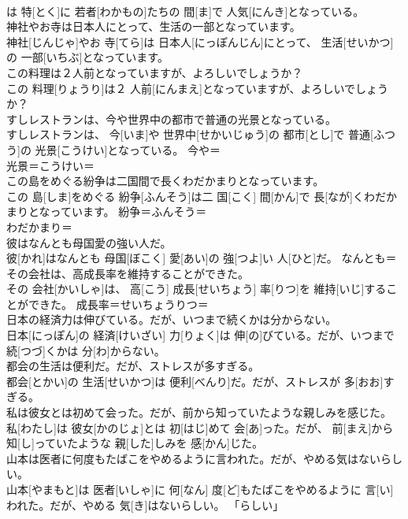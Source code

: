 \documentclass[8pt]{extreport}
\begin{document}
\begin{CJK}{UTF8}{min}
\\	は 特[とく]に 若者[わかもの]たちの 間[ま]で 人気[にんき]となっている。	
\\	神社やお寺は日本人にとって、生活の一部となっています。	
\\	神社[じんじゃ]やお 寺[てら]は 日本人[にっぽんじん]にとって、 生活[せいかつ]の 一部[いちぶ]となっています。	
\\	この料理は２人前となっていますが、よろしいでしょうか？	
\\	この 料理[りょうり]は２ 人前[にんまえ]となっていますが、よろしいでしょうか？	
\\	すしレストランは、今や世界中の都市で普通の光景となっている。	
\\	すしレストランは、 今[いま]や 世界中[せかいじゅう]の 都市[とし]で 普通[ふつう]の 光景[こうけい]となっている。	今や＝ 
\\	光景＝こうけい＝ 
\\	この島をめぐる紛争は二国間で長くわだかまりとなっています。	
\\	この 島[しま]をめぐる 紛争[ふんそう]は二 国[こく] 間[かん]で 長[なが]くわだかまりとなっています。	紛争＝ふんそう＝ 
\\	わだかまり＝ 
\\	彼はなんとも母国愛の強い人だ。	
\\	彼[かれ]はなんとも 母国[ぼこく] 愛[あい]の 強[つよ]い 人[ひと]だ。	なんとも＝ 
\\	その会社は、高成長率を維持することができた。	
\\	その 会社[かいしゃ]は、 高[こう] 成長[せいちょう] 率[りつ]を 維持[いじ]することができた。	成長率＝せいちょうりつ＝ 
\\	日本の経済力は伸びている。だが、いつまで続くかは分からない。	
\\	日本[にっぽん]の 経済[けいざい] 力[りょく]は 伸[の]びている。だが、いつまで 続[つづ]くかは 分[わ]からない。	
\\	都会の生活は便利だ。だが、ストレスが多すぎる。	
\\	都会[とかい]の 生活[せいかつ]は 便利[べんり]だ。だが、ストレスが 多[おお]すぎる。	
\\	私は彼女とは初めて会った。だが、前から知っていたような親しみを感じた。	
\\	私[わたし]は 彼女[かのじょ]とは 初[はじ]めて 会[あ]った。だが、 前[まえ]から 知[し]っていたような 親[した]しみを 感[かん]じた。	
\\	山本は医者に何度もたばこをやめるように言われた。だが、やめる気はないらしい。	
\\	山本[やまもと]は 医者[いしゃ]に 何[なん] 度[ど]もたばこをやめるように 言[い]われた。だが、やめる 気[き]はないらしい。	「らしい」

\end{CJK}
\end{document}
